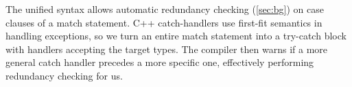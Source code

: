 \documentclass{llncs}
\begin{document}
The unified syntax allows automatic 
redundancy checking (\textsection\ref{sec:bg}) on case clauses of a match statement.
C++ catch-handlers use first-fit 
semantics in handling exceptions, so we turn an entire match statement into a 
try-catch block with handlers accepting the target types. 
The compiler then warns if a more general catch handler precedes a more 
specific one, effectively performing redundancy checking for us.

%
%
%
%
%
\end{document}
